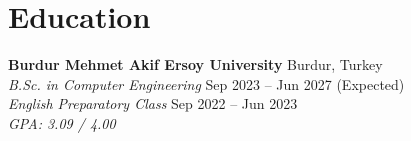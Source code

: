 \section{Education}

\textbf{Burdur Mehmet Akif Ersoy University} \hfill Burdur, Turkey \\
\textit{B.Sc. in Computer Engineering} \hfill Sep 2023 -- Jun 2027 (Expected) \\
\textit{English Preparatory Class} \hfill Sep 2022 -- Jun 2023 \\
\textit{GPA: 3.09 / 4.00}


